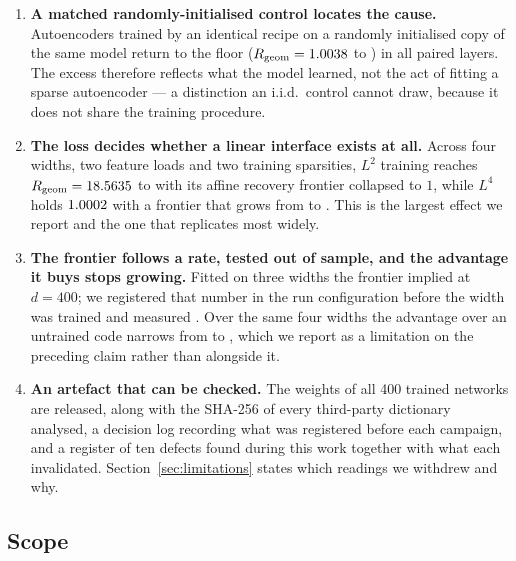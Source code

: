 \begin{enumerate}[leftmargin=*,itemsep=3pt]
\item \textbf{A matched randomly-initialised control locates the cause.} Autoencoders trained by an
identical recipe on a randomly initialised copy of the same model return to the floor
($R_{\mathrm{geom}}=1.0038$ to \SaeRandInitRgeomMax) in all \SaePairedLayers{} paired layers. The
excess therefore reflects what the model learned, not the act of fitting a sparse autoencoder --- a
distinction an i.i.d.\ control cannot draw, because it does not share the training procedure.

\item \textbf{The loss decides whether a linear interface exists at all.} Across four widths, two
feature loads and two training sparsities, $L^2$ training reaches $R_{\mathrm{geom}}=18.5635$ to
\ScLtwoRgeom{} with its affine recovery frontier collapsed to $1$, while $L^4$ holds
$1.0002$ with a frontier that grows from \FullLfourFiftyKappaMin{} to
\ScMeasured{}. This is the largest effect we report and the one that replicates most widely.

\item \textbf{The frontier follows a rate, tested out of sample, and the advantage it buys stops
growing.} Fitted on three widths the frontier implied \ScRegistered{} at $d=400$; we registered that
number in the run configuration before the width was trained and measured \ScMeasured{}. Over the
same four widths the advantage over an untrained code narrows from \MarginFiftyRatio{} to
\MarginFourHundredRatio{}, which we report as a limitation on the preceding claim rather than
alongside it.

\item \textbf{An artefact that can be checked.} The weights of all 400 trained networks are
released, along with the SHA-256 of every third-party dictionary analysed, a decision log recording
what was registered before each campaign, and a register of ten defects found during this work
together with what each invalidated. Section~\ref{sec:limitations} states which readings we
withdrew and why.

\end{enumerate}

\subsection{Scope}


